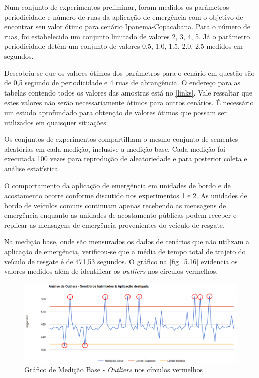 \documentclass[
12pt,				%
openright,			%
oneside,			%
a4paper,			%
brazil,				%
]{abntex2}
\begin{document}
	\par Num conjunto de experimentos preliminar, foram medidos os parâmetros periodicidade e número de ruas da aplicação de emergência com o objetivo de encontrar seu valor ótimo para cenário Ipanema-Copacabana. Para o número de ruas, foi estabelecido um conjunto limitado de valores {2, 3, 4, 5}. Já o parâmetro periodicidade detém um conjunto de valores {0.5, 1.0, 1.5, 2.0, 2.5} medidos em segundos. 
	
	\par Descobriu-se que os valores ótimos dos parâmetros para o cenário em questão são de 0,5 segundo de periodicidade e 4 ruas de abrangência. O endereço para as tabelas contendo todos os valores das amostras está no \autoref{links}. Vale ressaltar que estes valores não serão necessariamente ótimos para outros cenários. É necessário um estudo aprofundado para obtenção de valores ótimos que possam ser utilizados em quaisquer situações.
	
	\par Os conjuntos de experimentos compartilham o mesmo conjunto de sementes aleatórias em cada medição, inclusive a medição base. Cada medição foi executada 100 vezes para reprodução de aleatoriedade e para posterior coleta e análise estatística.
	
	\par O comportamento da aplicação de emergência em unidades de bordo e de acostamento ocorre conforme discutido nos experimentos 1 e 2. As unidades de bordo de veículos comuns continuam apenas recebendo as mensagens de emergência enquanto as unidades de acostamento públicas podem receber e replicar as mensagens de emergência provenientes do veículo de resgate.
	
	\par Na medição base, onde são mensurados os dados de cenários que não utilizam a aplicação de emergência, verificou-se que a média de tempo total de trajeto do veículo de resgate é de 471,53 segundos. O gráfico na \autoref{fig_5.16} evidencia os valores medidos além de identificar os \textit{outliers} nos círculos vermelhos.
	
	\begin{figure} [H]
		\centering
		\includegraphics[scale=.4]{figuras/cap5/516Grafico1}
		\caption{\label{fig_5.16}Gráfico de Medição Base - \textit{Outliers} nos círculos vermelhos}
	\end{figure}
	
\end{document}
